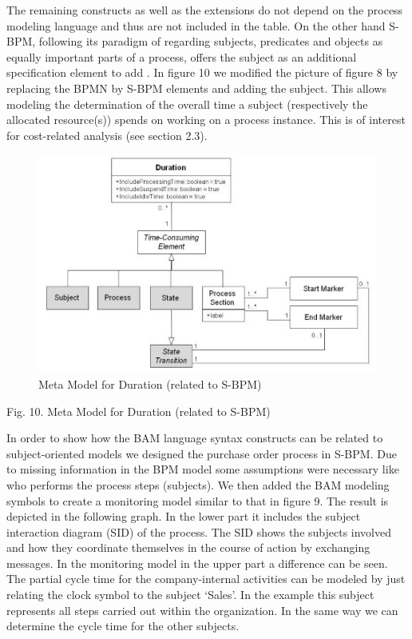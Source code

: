 The remaining constructs as well as the extensions do not depend on the process modeling language and thus are not included in the table.
On the other hand S-BPM, following its paradigm of regarding subjects, predicates and objects as equally important parts of a process, offers the subject as an additional specification element to add . In figure 10 we modified the picture of figure 8 by replacing the BPMN by S-BPM elements and adding the subject. This allows modeling the determination of the overall time a subject (respectively the allocated resource(s)) spends on working on a process instance. This is of interest for cost-related analysis (see section 2.3).

\begin{figure}[h]
	\centering
	\includegraphics[width=0.9\linewidth]{Figures/Chapter5/Monitoring/Meta-Mode-fo-Duration-relate- to-SBPM.jpg}
	\caption[Meta Model for Duration (related to S-BPM)]{Meta Model for Duration (related to S-BPM)}
	\label{fig:Meta-Model-S_BPM}
\end{figure}



Fig. 10. Meta Model for Duration (related to S-BPM)

In order to show how the BAM language syntax constructs can be related to subject-oriented models we designed the purchase order process in S-BPM. Due to missing information in the BPM model some assumptions were necessary like who performs the process steps (subjects). We then added the BAM modeling symbols to create a monitoring model similar to that in figure 9.
The result is depicted in the following graph. In the lower part it includes the subject interaction diagram (SID) of the process. The SID shows the subjects involved and how they coordinate themselves in the course of action by exchanging messages. In the monitoring model in the upper part a difference can be seen. The partial cycle time for the company-internal activities can be modeled by just relating the clock symbol to the subject ‘Sales’. In the example this subject represents all steps carried out within the organization. In the same way we can determine the cycle time for the other subjects.

